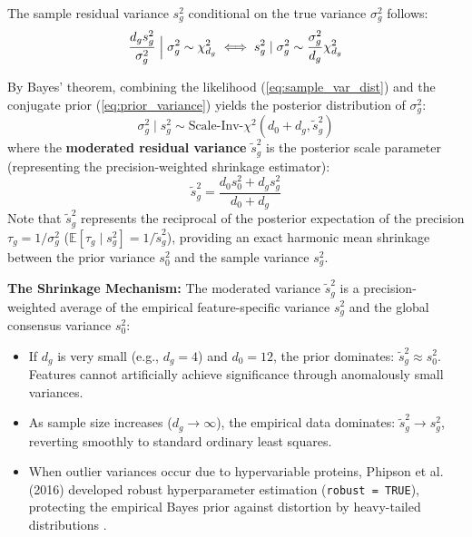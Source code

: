 \documentclass[11pt,twoside,openright]{book}
\begin{document}
The sample residual variance $s_g^2$ conditional on the true variance $\sigma_g^2$ follows:
\begin{equation}
\frac{d_g s_g^2}{\sigma_g^2} \Bigm| \sigma_g^2 \sim \chi^2_{d_g} \iff s_g^2 \mid \sigma_g^2 \sim \frac{\sigma_g^2}{d_g} \chi^2_{d_g}
\label{eq:sample_var_dist}
\end{equation}

By Bayes' theorem, combining the likelihood (\ref{eq:sample_var_dist}) and the conjugate prior (\ref{eq:prior_variance}) yields the posterior distribution of $\sigma_g^2$:
\begin{equation}
\sigma_g^2 \mid s_g^2 \sim \text{Scale-Inv-}\chi^2(d_0 + d_g, \tilde{s}_g^2)
\label{eq:posterior_variance}
\end{equation}
where the \textbf{moderated residual variance} $\tilde{s}_g^2$ is the posterior scale parameter (representing the precision-weighted shrinkage estimator):
\begin{equation}
\tilde{s}_g^2 = \frac{d_0 s_0^2 + d_g s_g^2}{d_0 + d_g}
\label{eq:moderated_variance_formula}
\end{equation}
Note that $\tilde{s}_g^2$ represents the reciprocal of the posterior expectation of the precision $\tau_g = 1/\sigma_g^2$ ($\mathbb{E}[\tau_g \mid s_g^2] = 1/\tilde{s}_g^2$), providing an exact harmonic mean shrinkage between the prior variance $s_0^2$ and the sample variance $s_g^2$.

\begin{svgraybox}
\textbf{The Shrinkage Mechanism:} The moderated variance $\tilde{s}_g^2$ is a precision-weighted average of the empirical feature-specific variance $s_g^2$ and the global consensus variance $s_0^2$:
\begin{itemize}
    \item If $d_g$ is very small (e.g., $d_g = 4$) and $d_0 = 12$, the prior dominates: $\tilde{s}_g^2 \approx s_0^2$. Features cannot artificially achieve significance through anomalously small variances.
    \item As sample size increases ($d_g \to \infty$), the empirical data dominates: $\tilde{s}_g^2 \to s_g^2$, reverting smoothly to standard ordinary least squares.
    \item When outlier variances occur due to hypervariable proteins, Phipson et al. (2016) developed robust hyperparameter estimation (\texttt{robust = TRUE}), protecting the empirical Bayes prior against distortion by heavy-tailed distributions \cite{phipson2016robust}.
\end{itemize}
\end{svgraybox}
\end{document}
